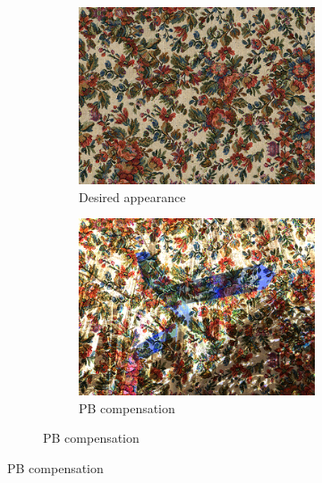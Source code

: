 \begin{figure}[ht]
    \centering    
    \begin{subfigure}{\textwidth}
        \centering
        \begin{subfigure}{0.3\textwidth}
            \centering
            \includegraphics[width=\textwidth]{images/01-results_teaser-target.jpg}
            \caption{Desired appearance}
            \label{fig:intro_results_teaser_target}
        \end{subfigure}
        \hfill
        \begin{subfigure}{0.3\textwidth}
            \centering
            \includegraphics[width=\textwidth]{images/01-results_teaser-pixels_opt.jpg}
            \caption{PB compensation}

\end{subfigure}
\end{subfigure}
\end{figure}
